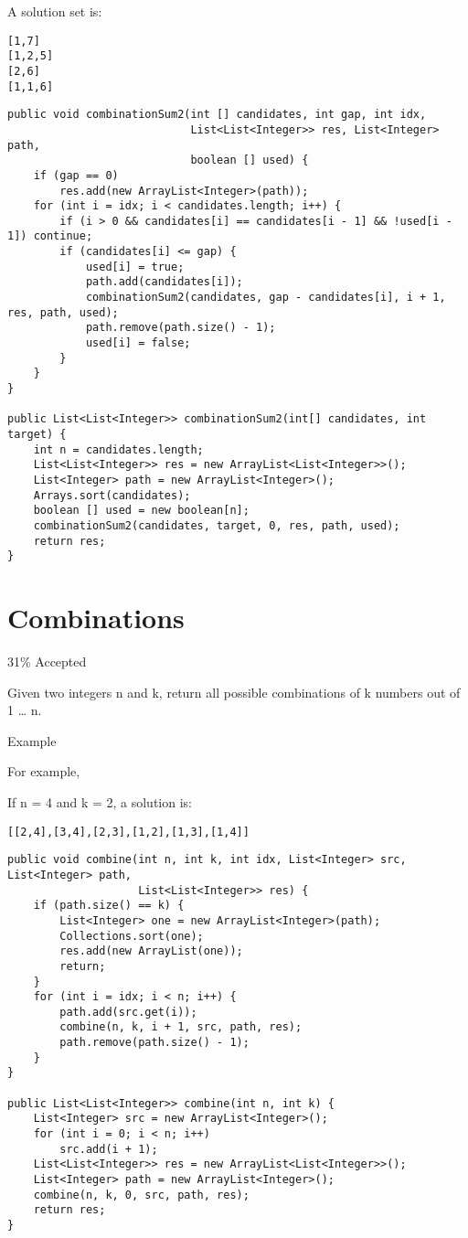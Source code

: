\documentclass[9pt, b5paaper]{book}
\begin{document}
A solution set is: 
\begin{verbatim}
[1,7]
[1,2,5]
[2,6]
[1,1,6]
\end{verbatim}
\begin{verbatim}
public void combinationSum2(int [] candidates, int gap, int idx, 
                            List<List<Integer>> res, List<Integer> path,
                            boolean [] used) {
    if (gap == 0) 
        res.add(new ArrayList<Integer>(path));
    for (int i = idx; i < candidates.length; i++) {
        if (i > 0 && candidates[i] == candidates[i - 1] && !used[i - 1]) continue;
        if (candidates[i] <= gap) {
            used[i] = true;
            path.add(candidates[i]);
            combinationSum2(candidates, gap - candidates[i], i + 1, res, path, used);
            path.remove(path.size() - 1);
            used[i] = false;
        }
    }
}
        
public List<List<Integer>> combinationSum2(int[] candidates, int target) {
    int n = candidates.length;
    List<List<Integer>> res = new ArrayList<List<Integer>>();
    List<Integer> path = new ArrayList<Integer>();
    Arrays.sort(candidates);
    boolean [] used = new boolean[n];
    combinationSum2(candidates, target, 0, res, path, used);
    return res;
}
\end{verbatim}
\section{Combinations}
\label{sec-1-24}

31\% Accepted

Given two integers n and k, return all possible combinations of k numbers out of 1 \ldots{} n.

Example

For example,

If n = 4 and k = 2, a solution is:
\begin{verbatim}
[[2,4],[3,4],[2,3],[1,2],[1,3],[1,4]]
\end{verbatim}
\begin{verbatim}
public void combine(int n, int k, int idx, List<Integer> src, List<Integer> path,
                    List<List<Integer>> res) {
    if (path.size() == k) {
        List<Integer> one = new ArrayList<Integer>(path);
        Collections.sort(one);
        res.add(new ArrayList(one));
        return;
    }
    for (int i = idx; i < n; i++) {
        path.add(src.get(i));
        combine(n, k, i + 1, src, path, res);
        path.remove(path.size() - 1);
    }
}
        
public List<List<Integer>> combine(int n, int k) {
    List<Integer> src = new ArrayList<Integer>();
    for (int i = 0; i < n; i++) 
        src.add(i + 1);
    List<List<Integer>> res = new ArrayList<List<Integer>>();
    List<Integer> path = new ArrayList<Integer>();
    combine(n, k, 0, src, path, res);
    return res;
}
\end{verbatim}
\end{document}

